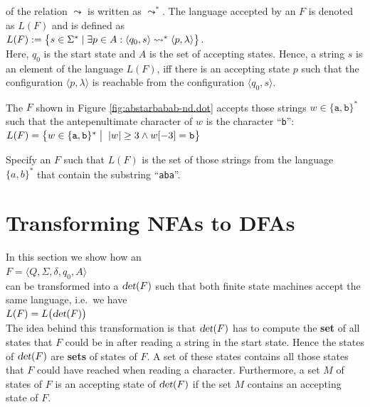 of the relation $\leadsto$ is written as $\leadsto^*$.
The language accepted by an  $F$ is
denoted as $L(F)$ and is defined as
\\[0.2cm]
\hspace*{1.3cm}
$L(F) := \bigl\{ s \in \Sigma^* \mid  
                 \exists p \in A : \pair(q_0,s) \leadsto^* \pair(p,\lambda) \bigr\}$.
\\[0.2cm]
Here,  $q_0$ is the  start state and $A$ is the set of accepting
states.  Hence, a string  $s$ is an element of the language  $L(F)$,  
iff there is an accepting state $p$ such that the configuration $\langle p, \lambda \rangle$ is reachable from the configuration $\langle q_0, s \rangle$.

\exampleEng 
The  $F$ shown in Figure \ref{fig:abstarbabab-nd.dot} accepts
those strings $w \in \{ \mathtt{a}, \mathtt{b} \}^*$ such that the
antepenultimate character of $w$ is  the character ``\texttt{b}'':
\\[0.2cm]
\hspace*{1.3cm}
$L(F) = \bigl\{ w \in \{ \mathtt{a}, \mathtt{b} \}^* \bigm|\; |w| \geq 3 \wedge w[-3] = \mathtt{b} \bigr\}$
 \eox
\vspace*{0.3cm}

\exerciseEng
Specify an  $F$ such that $L(F)$ is the set of those
strings from the language  $\{a,b\}^*$ that contain the substring ``\texttt{aba}''. \eox

\section{Transforming NFAs to DFAs \label{section:nfa-2-dfa}}
In this section we show how an  
\\[0.2cm]
\hspace*{1.3cm}
$F = \langle Q, \Sigma, \delta, q_0, A \rangle$ 
\\[0.2cm]
can be transformed into a  $\textsl{det}(F)$ such that both finite state machines accept the
same language, i.e.~we have
\\[0.2cm]
\hspace*{1.3cm}
$L(F) = L\bigl(\textsl{det}(F)\bigr)$
\\[0.2cm]
The idea behind this transformation is that $\textsl{det}(F)$ has to compute the \textbf{set} of all states that
$F$ could be in after reading a string in the start state.   Hence the states of 
$\textsl{det}(F)$ are  \textbf{sets} of states of $F$.  A set
of these states contains all those  
states that $F$ could have reached when reading a character.
Furthermore, a set $M$ of states of $F$ is an accepting state of 
$\textsl{det}(F)$ if the set $M$ contains an accepting state of $F$.

